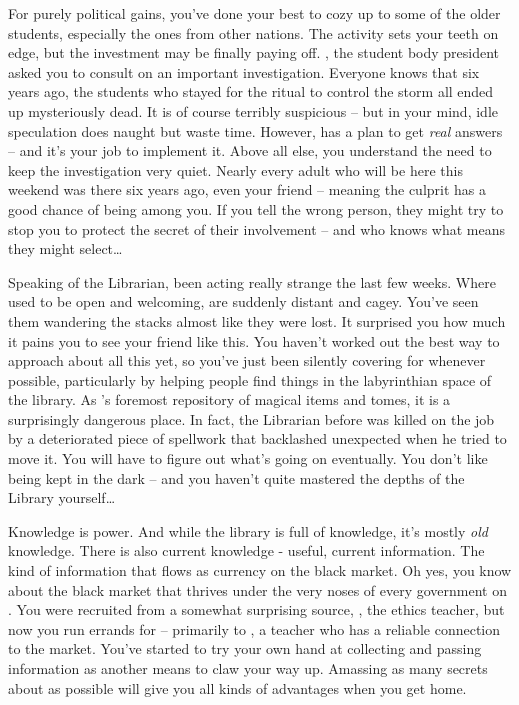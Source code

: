 \documentclass[char]{GL2020}
\begin{document}
For purely political gains, you’ve done your best to cozy up to some of the older students, especially the ones from other nations. The activity sets your teeth on edge, but the investment may be finally paying off. \cPresident{}, the student body president \cPresident{\themself} \cPresident{\have} asked you to consult on an important investigation. Everyone knows that six years ago, the students who stayed for the ritual to control the storm all ended up mysteriously dead. It is of course terribly suspicious -- but in your mind, idle speculation does naught but waste time. However, \cPresident{} has a plan to get \emph{real} answers -- and it’s your job to implement it. Above all else, you understand the need to keep the investigation very quiet. Nearly every adult who will be here this weekend was there six years ago, even your friend \cLibrarian{} -- meaning the culprit has a good chance of being among you. If you tell the wrong person, they might try to stop you to protect the secret of their involvement -- and who knows what means they might select\ldots

Speaking of the Librarian, \cLibrarian{\they} \cLibrarian{\have} been acting really strange the last few weeks. Where \cLibrarian{\they} used to be open and welcoming, \cLibrarian{\they} are suddenly distant and cagey. You’ve seen them wandering the stacks almost like they were lost. It surprised you how much it pains you to see your friend like this. You haven’t worked out the best way to approach \cLibrarian{\them} about all this yet, so you’ve just been silently covering for \cLibrarian{\them} whenever possible, particularly by helping people find things in the labyrinthian space of the library. As \pEarth{}’s foremost repository of magical items and tomes, it is a surprisingly dangerous place. In fact, the Librarian before \cLibrarian{} was killed on the job by a deteriorated piece of spellwork that backlashed unexpected when he tried to move it. You will have to figure out what’s going on eventually. You don’t like being kept in the dark -- and you haven’t quite mastered the depths of the Library yourself\ldots

Knowledge is power. And while the library is full of knowledge, it’s mostly \emph{old} knowledge. There is also current knowledge - useful, current information. The kind of information that flows as currency on the black market. Oh yes, you know about the black market that thrives under the very noses of every government on \pEarth{}. You were recruited from a somewhat surprising source, \cEthics{}, the ethics teacher, but now you run errands for \cEthics{\them} -- primarily to \cChupSecond{}, a teacher who has a reliable connection to the market. You’ve started to try your own hand at collecting and passing information as another means to claw your way up. Amassing as many secrets about \pFarm{} as possible will give you all kinds of advantages when you get home.
\end{document}

